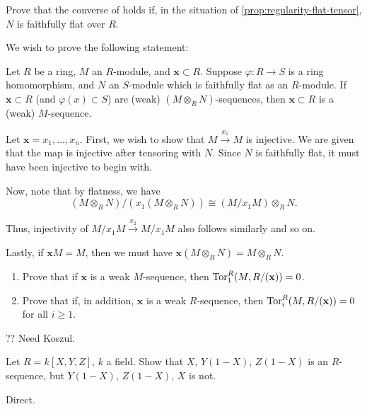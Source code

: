 \documentclass[12pt]{article}
\begin{document}
\begin{exe}
	Prove that the converse of  holds if, in the situation of \ref{prop:regularity-flat-tensor}, $N$ is faithfully flat over $R$.
\end{exe}
\begin{soln}
	We wish to prove the following statement: \newline
	
	\begin{blockquote}
		Let $R$ be a ring, $M$ an $R$-module, and $\mathbf{x} \subset R$. Suppose $\varphi : R \to S$ is a ring homomorphism, and $N$ an $S$-module which is faithfully flat as an $R$-module. \newline
		If $\mathbf{x} \subset R$ (and $\varphi(x) \subset S$) are (weak) $(M \otimes_{R} N)$-sequences, then $\mathbf{x} \subset R$ is a (weak) $M$-sequence.
	\end{blockquote}

	Let $\mathbf{x} = x_{1}, \ldots, x_{n}$. First, we wish to show that $M \xrightarrow{x_{1}} M$ is injective. We are given that the map is injective after tensoring with $N$. Since $N$ is faithfully flat, it must have been injective to begin with.

	Now, note that by flatness, we have
	\begin{equation*} 
		(M \otimes_{R} N)/(x_{1} (M \otimes_{R} N)) \cong (M/x_{1} M) \otimes_{R} N.
	\end{equation*}

	Thus, injectivity of $M/x_{1} M \xrightarrow{x_{2}} M/x_{1} M$ also follows similarly and so on.

	Lastly, if $\mathbf{x} M = M$, then we must have $\mathbf{x} (M \otimes_{R} N) = M \otimes_{R} N$.
\end{soln}

\begin{exe}
	\begin{enumerate}
		\item Prove that if $\mathbf{x}$ is a weak $M$-sequence, then $\operatorname{Tor}^{R}_{1}(M, R/(\mathbf{x})) = 0$.
		\item Prove that if, in addition, $\mathbf{x}$ is a weak $R$-sequence, then $\operatorname{Tor}^{R}_{i}(M, R/(\mathbf{x})) = 0$ for all $i \ge 1$.
	\end{enumerate}
\end{exe}
\begin{soln}
	?? Need Koszul.
\end{soln}

\begin{exe}
	Let $R = k[X, Y, Z]$, $k$ a field. Show that $X$, $Y(1 - X)$, $Z(1 - X)$ is an $R$-sequence, but $Y(1 - X)$, $Z(1 - X)$, $X$ is not.
\end{exe}
\begin{soln}
	Direct.
\end{soln}
\end{document}
